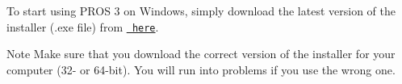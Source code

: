 To start using P\+R\+OS 3 on Windows, simply download the latest version of the installer (.exe file) from \href{https://github.com/purduesigbots/pros-cli3/releases/latest/}{\texttt{ here}}.

\begin{DoxyNote}{Note}
Make sure that you download the correct version of the installer for your computer (32-\/ or 64-\/bit). You will run into problems if you use the wrong one. 
\end{DoxyNote}
